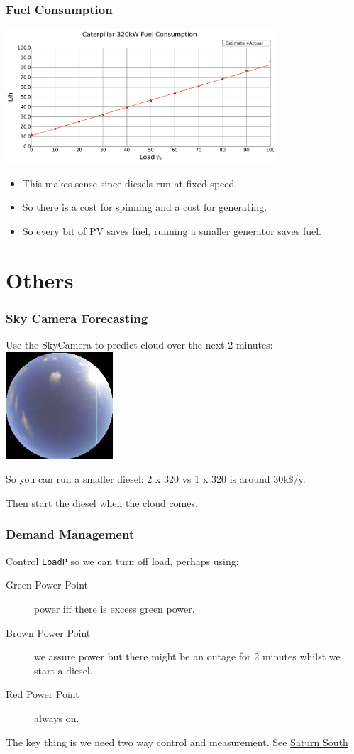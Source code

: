 \documentclass{beamer}
\begin{document}
\begin{frame}\frametitle{Fuel Consumption}
\includegraphics[width=10cm]{limits/figFuelCurve2.pdf}
\pause

\begin{itemize}
\item This makes sense since diesels run at fixed speed.
\pause
\item So there is a cost for spinning and a cost for generating.
\pause
\item So every bit of PV saves fuel, running a smaller generator
  saves fuel.
\end{itemize}
\end{frame}

\section{Others}
\begin{frame}\frametitle{Sky Camera Forecasting}
Use the SkyCamera to predict cloud over the next 2 minutes:
\pause
\includegraphics[width=4cm]{batch-2014-07-28T165557+0930-basis.jpg}
\pause

So you can run a smaller diesel: 2 x 320 vs 1 x 320 is around 30k\$/y.
\pause

Then start the diesel when the cloud comes.
\end{frame}

\begin{frame}\frametitle{Demand Management}
Control \texttt{LoadP} so we can turn off load, perhaps using:

\begin{description}
\item[Green Power Point] power iff there is excess green power.
\item[Brown Power Point] we assure power but there might be an outage
  for 2 minutes whilst we start a diesel.
\item[Red Power Point] always on.
\end{description}

The key thing is we need two way control and measurement.
See \href{http://www.saturnsouth.com}{Saturn South}
\end{frame}
\end{document}
